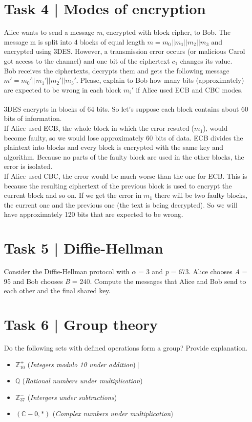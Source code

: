 \documentclass{article}
\begin{document}
\section*{Task 4 | Modes of encryption}
Alice wants to send a message \textit{m}, encrypted with block cipher, to Bob. The message m
is split into 4 blocks of equal length $m = m_0||m_1||m_2||m_3$ and encrypted using 3DES.
However, a transmission error occurs (or malicious Carol got access to the channel) and
one bit of the ciphertext $c_1$ changes its value. \\
Bob receives the ciphertexts, decrypts them and gets the following message 
$m' = m_0'||m_1'||m_2'||m_3'$. 
Please, explain to Bob how many bits (approximately) are expected to
be wrong in each block $m_i'$ if Alice used ECB and CBC modes. \\\\
3DES encrypts in blocks of 64 bits. So let's suppose each block contains about 60 bits of information. \\
If Alice used ECB, the whole block in which the error resuted ($m_1$), would
become faulty, so we would lose approximately 60 bits of data. ECB divides the plaintext
into blocks and every block is encrypted with the same key and algorithm. Because no parts
of the faulty block are used in the other blocks, the error is isolated. \\
If Alice used CBC, the error would be much worse than the one for ECB. This is because the
resulting ciphertext of the previous block is used to encrypt the current block and so on. If
we get the error in $m_1$ there will be two faulty blocks, the current one and the previous one (the text is being decrypted).
So we will have approximately 120 bits that are expected to be wrong.




\section*{Task 5 | Diffie-Hellman}
Consider the Diffie-Hellman protocol with $\alpha$ = 3 and \textit{p} = 673. Alice chooses
\textit{A} = 95 and Bob chooses \textit{B} = 240. Compute the messages that Alice and Bob
send to each other and the final shared key.


\section*{Task 6 | Group theory}
Do the following sets with defined operations form a group? Provide explanation.
\begin{itemize}
    \item $\mathbb{Z}_{10}^+$ (\textit{Integers modulo 10 under addition}) | 

    \item $\mathbb{Q}$ (\textit{Rational numbers under multiplication}) 
    \item $\mathbb{Z}_{37}^-$ (\textit{Intergers under subtractions})
    \item $(\mathbb{C} - 0, *)$ (\textit{Complex numbers under multiplication})
\end{itemize}
\end{document}
